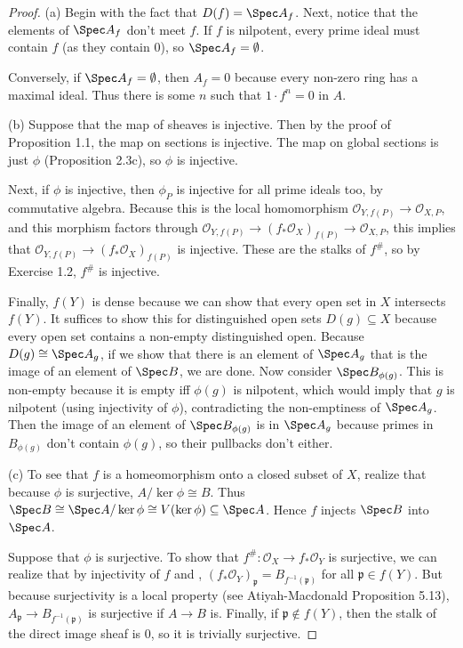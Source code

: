 \begin{proof}
	(a) Begin with the fact that $D(f) = \Spec A_f $.
	Next, notice that the elements of $\Spec A_f $ don't meet $f $.
	If $f $ is nilpotent, every prime ideal must contain $f $ (as they contain $0 $), so $\Spec A_f = \emptyset $.

	Conversely, if $\Spec A_f = \emptyset $, then $A_f = 0$ because every non-zero ring has a maximal ideal.
	Thus there is some $n $ such that $1\cdot f^n = 0 $ in $A $.

	(b) Suppose that the map of sheaves is injective.
	Then by the proof of Proposition 1.1, the map on sections is injective.
	The map on global sections is just $\phi  $ (Proposition 2.3c), so $\phi  $ is injective.

	Next, if $\phi  $ is injective, then $\phi _P $ is injective for all prime ideals too, by commutative algebra.
	Because this is the local homomorphism $\mathcal{O}_{Y,f(P)} \to \mathcal{O}_{X,P} $, and this morphism factors through $\mathcal{O}_{Y,f(P)} \to (f_\ast \mathcal{O}_{X})_{f(P)} \to \mathcal{O}_{X,P}$, this implies that $\mathcal{O}_{Y,f(P)}\to (f_\ast \mathcal{O}_X)_{f(P)} $ is injective.
	These are the stalks of $f^\# $, so by Exercise 1.2, $f^\#$ is injective.

	Finally, $f(Y) $ is dense because we can show that every open set in $X $ intersects $f(Y) $.
	It suffices to show this for distinguished open sets $D(g) \subseteq X $ because every open set contains a non-empty distinguished open.
	Because $D(g) \cong \Spec A_g $, if we show that there is an element of $\Spec A_g $ that is the image of an element of $\Spec B $, we are done.
	Now consider $\Spec B_{\phi (g)} $.
	This is non-empty because it is empty iff $\phi (g) $ is nilpotent, which would imply that $g $ is nilpotent (using injectivity of $\phi  $), contradicting the non-emptiness of $\Spec A_g $.
	Then the image of an element of $\Spec B_{\phi (g)} $ is in $\Spec A_g $ because primes in $B_{\phi (g)} $ don't contain $\phi (g) $, so their pullbacks don't either.

	(c)
	To see that $f $ is a homeomorphism onto a closed subset of $X $, realize that because $\phi  $ is surjective, $A / \ker \phi \cong B $.
	Thus $\Spec B \cong \Spec A / \ker \phi \cong V(\ker \phi) \subseteq \Spec A$.
	Hence $f $ injects $\Spec B $ into $\Spec A $.

	Suppose that $\phi  $ is surjective.
	To show that $f^\# : \mathcal{O}_{X} \to f_\ast \mathcal{O}_{Y}$ is surjective, we can realize that by injectivity of $f $ and , $(f_\ast \mathcal{O}_{Y})_{\mathfrak{p}} = B_{f^{-1}(\mathfrak{p})}$ for all $\mathfrak{p} \in f(Y) $.
	But because surjectivity is a local property (see Atiyah-Macdonald Proposition 5.13), $A_{\mathfrak{p}}\to B_{f^{-1}(\mathfrak{p})} $ is surjective if $A\to B $ is.
	Finally, if $\mathfrak{p} \notin f(Y) $, then the stalk of the direct image sheaf is 0, so it is trivially surjective.


\end{proof}
